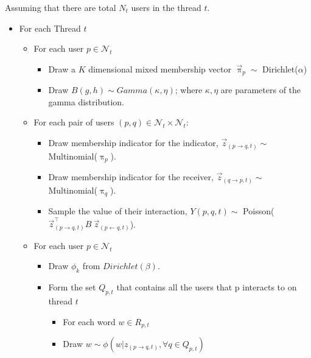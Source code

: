 Assuming that there are total $N_t$ users in the thread $t$.  
\begin{itemize}
  \item For each Thread $t$
\begin{itemize}
  \item For each user $p \in \mathcal{N}_t$
  \begin{itemize}
    \item Draw a $K$ dimensional mixed membership vector 
    $\overset{\rightarrow}{\uppi}_{p} \sim$ Dirichlet($\alpha$)

    \item Draw $B(g,h) \sim Gamma(\kappa,\eta)$; where $\kappa, \eta$ are
    parameters of the gamma distribution.
  \end{itemize}

  \item For each pair of users $(p, q) \in \mathcal{N}_t \times \mathcal{N}_t$:
  \begin{itemize}
    \item Draw membership indicator for the indicator, 
    $\overset{\rightarrow}{z}_{(p \rightarrow q,t)} \sim$
    Multinomial($\uppi_{p}$).
    \item Draw membership indicator for the receiver,
    $\overset{\rightarrow}{z}_{(q \rightarrow p,t)} \sim$
    Multinomial($\uppi_{q}$).
    \item Sample the value of their interaction, $Y(p,q,t) \sim$
    Poisson(${\overset{\rightarrow}{z}}^{\top}_{(p \rightarrow q,t)}
    B~\overset{\rightarrow}{z}_{(p \leftarrow q,t)}$). 
	\end{itemize}
	\item For each user $p \in \mathcal{N}_t$
	\begin{itemize}
	  \item Draw $\phi_{k}$ from $Dirichlet(\beta)$.
	  \item Form the set $Q_{p,t}$ that contains all the users that p interacts to
	  on thread $t$
	  \begin{itemize}
	    \item For each word $w \in R_{p,t}$ 
	    \item Draw $w \sim \phi(w|z_{(p \rightarrow q,t)}, \forall q\in Q_{p,t})$  
	  \end{itemize}
  \end{itemize}
\end{itemize}  
\end{itemize}

